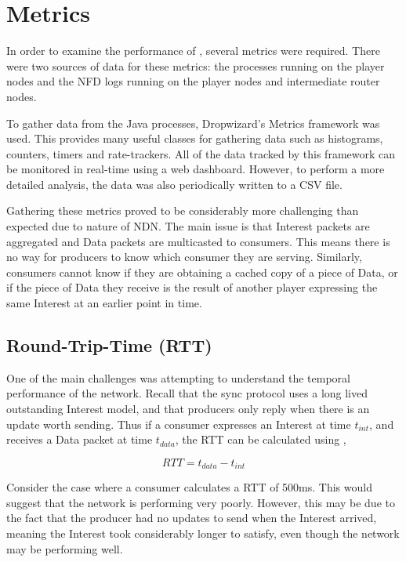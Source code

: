 \section{Metrics}\label{sec:impl:metrics}
In order to examine the performance of \game{}, several metrics were required. There were two sources of data for these metrics: the \game{} processes running on the player nodes and the NFD logs running on the player nodes and intermediate router nodes. 

To gather data from the \game{} Java processes, Dropwizard's Metrics framework \cite{dropwizard-metrics} was used. This provides many useful classes for gathering data such as histograms, counters, timers and rate-trackers. All of the data tracked by this framework can be monitored in real-time using a web dashboard. However, to perform a more detailed analysis, the data was also periodically written to a CSV file.


Gathering these metrics proved to be considerably more challenging than expected due to nature of NDN. The main issue is that Interest packets are aggregated and Data packets are multicasted to consumers. This means there is no way for producers to know which consumer they are serving. Similarly, consumers cannot know if they are obtaining a cached copy of a piece of Data, or if the piece of Data they receive is the result of another player expressing the same Interest at an earlier point in time. 

\subsection{Round-Trip-Time (RTT)}
One of the main challenges was attempting to understand the temporal performance of the network. Recall that the sync protocol uses a long lived outstanding Interest model, and that producers only reply when there is an update worth sending. Thus if a consumer expresses an Interest at time $t_{int}$, and receives a Data packet at time $t_{data}$, the RTT can be calculated using ,

\begin{equation}\label{eq:impl:rtt}
    RTT = t_{data} - t_{int}
\end{equation}

Consider the case where a consumer calculates a RTT of 500ms. This would suggest that the network is performing very poorly. However, this may be due to the fact that the producer had no updates to send when the Interest arrived,  meaning the Interest took considerably longer to satisfy, even though the network may be performing well.

